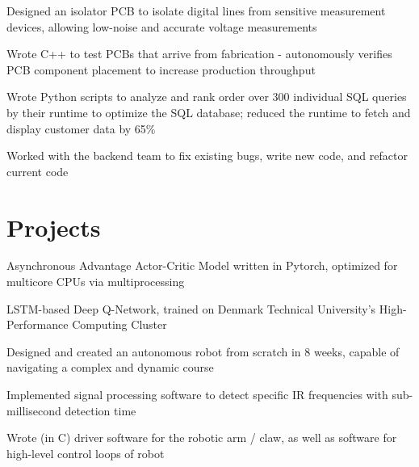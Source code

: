 \documentclass[]{deedy-resume-openfont}
\begin{document}
\begin{tightemize}
\item Designed an isolator PCB to isolate digital lines from sensitive measurement devices, allowing low-noise and accurate voltage measurements
\item Wrote C++ to test PCBs that arrive from fabrication - autonomously verifies PCB component placement to increase production throughput
\end{tightemize}

\vspace{8pt}


\begin{tightemize}
\item Wrote Python scripts to analyze and rank order over 300 individual SQL queries by their runtime to optimize the SQL database; reduced the runtime to fetch and display customer data by 65\%
\item Worked with the backend team to fix existing bugs, write new code, and refactor current code
\end{tightemize}

\vspace{12pt}


\section{Projects}

\begin{tightemize}
\item Asynchronous Advantage Actor-Critic Model written in Pytorch, optimized for multicore CPUs via multiprocessing
\item LSTM-based Deep Q-Network, trained on Denmark Technical University's High-Performance Computing Cluster
\end{tightemize}

\vspace{8pt}

\begin{tightemize}
\item Designed and created an autonomous robot from scratch in 8 weeks, capable of navigating a complex and dynamic course
\item Implemented signal processing software to detect specific IR frequencies with sub-millisecond detection time
\item Wrote (in C) driver software for the robotic arm / claw, as well as software for high-level control loops of robot
\end{tightemize}
\end{document}
